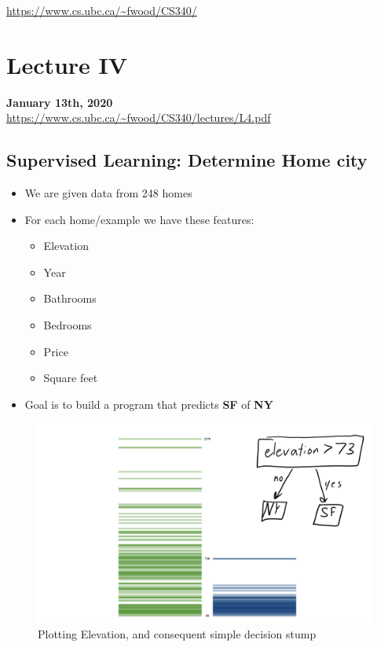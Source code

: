 \documentclass{article}
\theoremstyle{definition}
\begin{document}
\noindent \url{https://www.cs.ubc.ca/~fwood/CS340/}

\section*{Lecture IV}
\textbf{January 13th, 2020}\\
\noindent \url{https://www.cs.ubc.ca/~fwood/CS340/lectures/L4.pdf}


\subsection*{Supervised Learning: Determine Home city}
\begin{itemize}
	\item We are given data from 248 homes
	\item For each home/example we have these features:
	\begin{itemize}
		\item Elevation
		\item Year
		\item Bathrooms
		\item Bedrooms
		\item Price
		\item Square feet
	\end{itemize}
\item Goal is to build a program that predicts {\bf SF} of {\bf NY}
\end{itemize}
\begin{figure}[H]
	\centering
	\includegraphics[width = 5in]{Pic1}
	\caption{Plotting Elevation, and consequent simple decision stump}
\end{figure}
\end{document}
